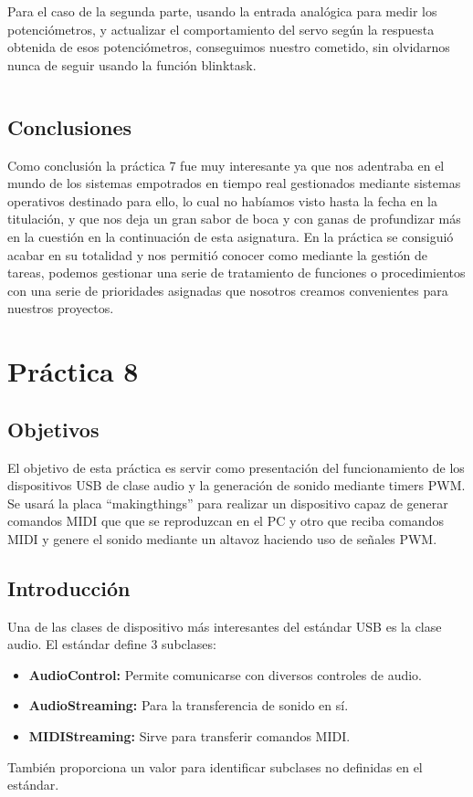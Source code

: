\documentclass[a4paper, 11pt]{article}
\begin{document}
Para el caso de la segunda parte, usando la entrada analógica
para medir los potenciómetros, y actualizar el comportamiento del
servo según la respuesta obtenida de esos potenciómetros,
conseguimos nuestro cometido, sin olvidarnos nunca de seguir
usando la función blinktask.
\inputminted[tabsize=4, fontsize=\small]{c}{prac7-makeservo.c}

\subsection{Conclusiones}
Como conclusión la práctica 7 fue muy interesante ya que nos
adentraba en el mundo de los sistemas empotrados en tiempo real
gestionados mediante sistemas operativos destinado para ello, lo
cual no habíamos visto hasta la fecha en la titulación, y que nos
deja un gran sabor de boca y con ganas de profundizar más en la
cuestión en la continuación de esta asignatura.  En la práctica
se consiguió acabar en su totalidad y nos permitió conocer como
mediante la gestión de tareas, podemos gestionar una serie de
tratamiento de funciones o procedimientos con una serie de
prioridades asignadas que nosotros creamos convenientes para
nuestros proyectos.

\section{Práctica 8}

\subsection{Objetivos}
El objetivo de esta práctica es servir como presentación del
funcionamiento de los dispositivos USB de clase audio y la
generación de sonido mediante timers PWM. Se usará la placa
``makingthings'' para realizar un dispositivo capaz de generar
comandos MIDI que que se reproduzcan en el PC y otro que reciba
comandos MIDI y genere el sonido mediante un altavoz haciendo uso
de señales PWM.

\subsection{Introducción}
Una de las clases de dispositivo más interesantes del estándar USB
es la clase audio. El estándar define 3 subclases:
\begin{itemize}
    \item \textbf{AudioControl:} Permite comunicarse con diversos
        controles de audio.
    \item \textbf{AudioStreaming:} Para la transferencia de sonido
        en sí.
    \item \textbf{MIDIStreaming:} Sirve para transferir comandos
        MIDI.
\end{itemize}
También proporciona un valor para identificar subclases no definidas en el
estándar.
\end{document}
